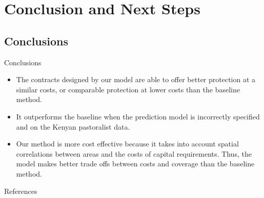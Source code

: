 \documentclass{beamer}
\begin{document}
\section{Conclusion and Next Steps}
\subsection{Conclusions}
\begin{frame}{Conclusions}
    \begin{itemize}
    \setlength\itemsep{2em}
        \item The contracts designed by our model are able to offer better protection at a similar costs, or comparable protection at lower costs than the baseline method. 
        \item It outperforms the baseline when the prediction model is incorrectly specified and on the Kenyan pastoralist data. 
        \item Our method is more cost effective because it takes into account spatial correlations between  areas and the costs of capital requirements. Thus, the model makes better trade offs between costs and coverage than the baseline method. 
        
    \end{itemize}
\end{frame}


\begin{frame}{References}
\printbibliography
\end{frame}
\end{document}
